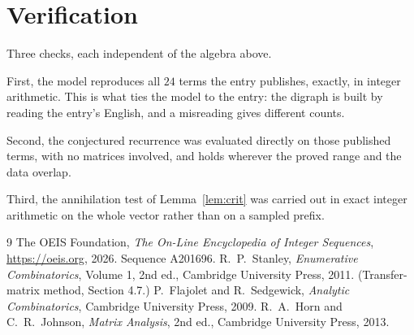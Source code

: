\documentclass[11pt,a4paper]{article}
\theoremstyle{plain}
\theoremstyle{definition}
\begin{document}
\section{Verification}

Three checks, each independent of the algebra above.

First, the model reproduces all $24$ terms the entry publishes, exactly, in integer
arithmetic. This is what ties the model to the entry: the digraph is built by reading the
entry's English, and a misreading gives different counts.

Second, the conjectured recurrence was evaluated directly on those published terms, with no
matrices involved, and holds wherever the proved range and the data overlap.

Third, the annihilation test of Lemma~\ref{lem:crit} was carried out in exact integer
arithmetic on the whole vector rather than on a sampled prefix.

\begin{thebibliography}{9}
 The OEIS Foundation, \emph{The On-Line Encyclopedia of Integer
Sequences}, \url{https://oeis.org}, 2026. Sequence A201696.
 R.~P.~Stanley, \emph{Enumerative Combinatorics}, Volume 1, 2nd ed.,
Cambridge University Press, 2011. (Transfer-matrix method, Section 4.7.)
 P.~Flajolet and R.~Sedgewick, \emph{Analytic Combinatorics}, Cambridge
University Press, 2009.
 R.~A.~Horn and C.~R.~Johnson, \emph{Matrix Analysis}, 2nd ed., Cambridge
University Press, 2013.
\end{thebibliography}
\end{document}
